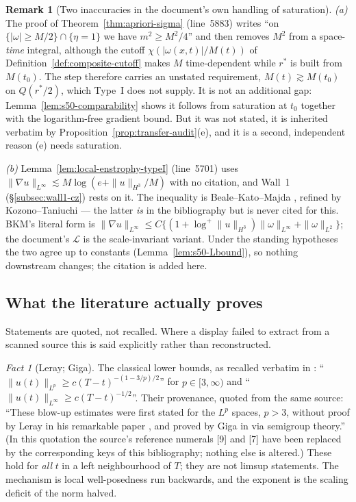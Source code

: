 \documentclass[11pt]{article}
\theoremstyle{definition}
\newtheorem{remark}[theorem]{Remark}
\theoremstyle{remark}
\newtheorem{fact}[theorem]{Fact}
\begin{document}
\begin{remark}[Two inaccuracies in the document's own handling of saturation]
  \label{rem:s50-doc-inaccuracies}
  \emph{(a)} The proof of Theorem~\ref{thm:apriori-sigma} (line~5883) writes
  ``on $\{|\omega|\geq M/2\}\cap\{\eta=1\}$ we have $m^2\geq M^2/4$'' and then
  removes $M^2$ from a space-\emph{time} integral, although the cutoff
  $\chi(|\omega(x,t)|/M(t))$ of Definition~\ref{def:composite-cutoff} makes
  $M$ time-dependent while $r^*$ is built from $M(t_0)$. The step therefore
  carries an unstated requirement, $M(t)\gtrsim M(t_0)$ on $Q(r^*/2)$, which
  Type~I does not supply. It is not an additional gap:
  Lemma~\ref{lem:s50-comparability} shows it follows from saturation at $t_0$
  together with the logarithm-free gradient bound. But it was not stated, it
  is inherited verbatim by Proposition~\ref{prop:transfer-audit}(e), and it is
  a second, independent reason (e) needs saturation.

  \emph{(b)} Lemma~\ref{lem:local-enstrophy-typeI} (line~5701) uses
  $\|\nabla u\|_{L^\infty}\lesssim M\log(e+\|u\|_{H^3}/M)$ with no citation,
  and Wall~1 (§\ref{subsec:wall1-cz}) rests on it. The inequality is
  Beale--Kato--Majda \cite[(15)]{BKM1984}, refined by Kozono--Taniuchi
  \cite{KozonoTaniuchi2000} --- the latter \emph{is} in the bibliography but
  is never cited for this. BKM's literal form is
  $\|\nabla u\|_{L^\infty}\leq C\{(1+\log^+\|u\|_{H^3})\|\omega\|_{L^\infty}
  +\|\omega\|_{L^2}\}$; the document's $\mathcal{L}$ is the scale-invariant
  variant. Under the standing hypotheses the two agree up to constants
  (Lemma~\ref{lem:s50-Lbound}), so nothing downstream changes; the citation is
  added here.
\end{remark}

\subsection{What the literature actually proves}
\label{subsec:s50-literature}

Statements are quoted, not recalled. Where a display failed to extract from a
scanned source this is said explicitly rather than reconstructed.

\begin{fact}[Leray; Giga]\label{fact:s50-leray}
  The classical lower bounds, as recalled verbatim in
  \cite[§1]{CortissozMontero2016}: ``$\|u(t)\|_{L^p}\geq c(T-t)^{-(1-3/p)/2}$''
  for $p\in[3,\infty)$ and ``$\|u(t)\|_{L^\infty}\geq c(T-t)^{-1/2}$''. Their
  provenance, quoted from the same source: ``These blow-up estimates were
  first stated for the $L^p$ spaces, $p>3$, without proof by Leray in his
  remarkable paper \cite{Leray1934}, and proved by Giga in \cite{Giga1986} via
  semigroup theory.'' (In this quotation the source's reference numerals
  \textup{[9]} and \textup{[7]} have been replaced by the corresponding keys of
  this bibliography; nothing else is altered.) These hold for \emph{all} $t$ in a left neighbourhood of
  $T$; they are not limsup statements. The mechanism is local well-posedness
  run backwards, and the exponent is the scaling deficit of the norm halved.
\end{fact}
\end{document}
